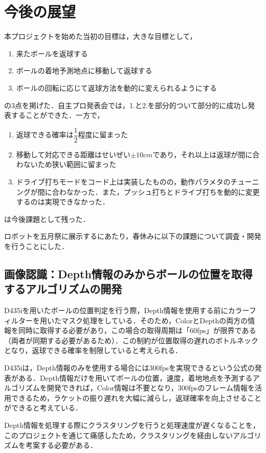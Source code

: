 \documentclass[10pt, oneside, titlepage]{ltjsarticle}  %
\begin{document}
\section{今後の展望}
本プロジェクトを始めた当初の目標は，大きな目標として，
\begin{enumerate}
  \item 来たボールを返球する
  \item ボールの着地予測地点に移動して返球する
  \item ボールの回転に応じて返球方法を動的に変えられるようにする
\end{enumerate}
の3点を掲げた．自主プロ発表会では，1.と2.を部分的ついて部分的に成功し発表することができた．一方で，
\begin{enumerate}
\item 返球できる確率は$\dfrac{1}{2}$程度に留まった
\item 移動して対応できる距離はせいぜい$\pm 10 cm$であり，それ以上は返球が間に合わないため狭い範囲に留まった
\item ドライブ打ちモードをコード上は実装したものの，動作パラメタのチューニングが間に合わなかった．また，プッシュ打ちとドライブ打ちを動的に変更するのは実現できなかった．
\end{enumerate}
は今後課題として残った．

ロボットを五月祭に展示するにあたり，春休みに以下の課題について調査・開発を行うことにした．
\subsection{画像認識：Depth情報のみからボールの位置を取得するアルゴリズムの開発}
D435iを用いたボールの位置判定を行う際，Depth情報を使用する前にカラーフィルターを用いたマスク処理をしている．そのため，ColorとDepthの両方の情報を同時に取得する必要があり，この場合の取得周期は「60fps」が限界である（両者が同期する必要があるため）．この制約が位置取得の遅れのボトルネックとなり，返球できる確率を制限していると考えられる．

D435iは，Depth情報のみを使用する場合には300fpsを実現できるという公式の発表がある\cite{intel}．Depth情報だけを用いてボールの位置，速度，着地地点を予測するアルゴリズムを開発できれば，Color情報は不要となり，300fpsのフレーム情報を活用できるため，ラケットの振り遅れを大幅に減らし，返球確率を向上させることができると考えている．

Depth情報を処理する際にクラスタリングを行うと処理速度が遅くなることを，このプロジェクトを通じて痛感したため，クラスタリングを経由しないアルゴリズムを考案する必要がある．
\end{document}
